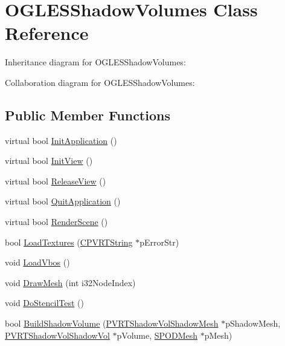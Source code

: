 \hypertarget{class_o_g_l_e_s_shadow_volumes}{\section{O\+G\+L\+E\+S\+Shadow\+Volumes Class Reference}
\label{class_o_g_l_e_s_shadow_volumes}
}


Inheritance diagram for O\+G\+L\+E\+S\+Shadow\+Volumes\+:


Collaboration diagram for O\+G\+L\+E\+S\+Shadow\+Volumes\+:
\subsection*{Public Member Functions}
\begin{DoxyCompactItemize}
\item 
virtual bool \hyperlink{class_o_g_l_e_s_shadow_volumes_a26148bde2a026bbaa9c44b235487ac85}{Init\+Application} ()
\item 
virtual bool \hyperlink{class_o_g_l_e_s_shadow_volumes_ac0a61f9b6738561c811675d97495ada3}{Init\+View} ()
\item 
virtual bool \hyperlink{class_o_g_l_e_s_shadow_volumes_addf7d9164edf04e4cfb8fb1a4fb88a4e}{Release\+View} ()
\item 
virtual bool \hyperlink{class_o_g_l_e_s_shadow_volumes_ad8bc8e54e1d4f2ee2236e0b3d6e187ad}{Quit\+Application} ()
\item 
virtual bool \hyperlink{class_o_g_l_e_s_shadow_volumes_a14c23788feb61d8592b455026444a65a}{Render\+Scene} ()
\item 
bool \hyperlink{class_o_g_l_e_s_shadow_volumes_aea60f7c28346b205963bed2ab1e013f7}{Load\+Textures} (\hyperlink{class_c_p_v_r_t_string}{C\+P\+V\+R\+T\+String} $\ast$p\+Error\+Str)
\item 
void \hyperlink{class_o_g_l_e_s_shadow_volumes_aef4e3b9d049d4b7fbb8b1ba35757c7e3}{Load\+Vbos} ()
\item 
void \hyperlink{class_o_g_l_e_s_shadow_volumes_a2fa930f209502e14d6bc0a161d46ca13}{Draw\+Mesh} (int i32\+Node\+Index)
\item 
void \hyperlink{class_o_g_l_e_s_shadow_volumes_a3f50a318203e252634347178f7610bdb}{Do\+Stencil\+Test} ()
\item 
bool \hyperlink{class_o_g_l_e_s_shadow_volumes_afc81514c8ae501c2e7b90e5403eed799}{Build\+Shadow\+Volume} (\hyperlink{struct_p_v_r_t_shadow_vol_shadow_mesh}{P\+V\+R\+T\+Shadow\+Vol\+Shadow\+Mesh} $\ast$p\+Shadow\+Mesh, \hyperlink{struct_p_v_r_t_shadow_vol_shadow_vol}{P\+V\+R\+T\+Shadow\+Vol\+Shadow\+Vol} $\ast$p\+Volume, \hyperlink{struct_s_p_o_d_mesh}{S\+P\+O\+D\+Mesh} $\ast$p\+Mesh)

\end{DoxyCompactItemize}
